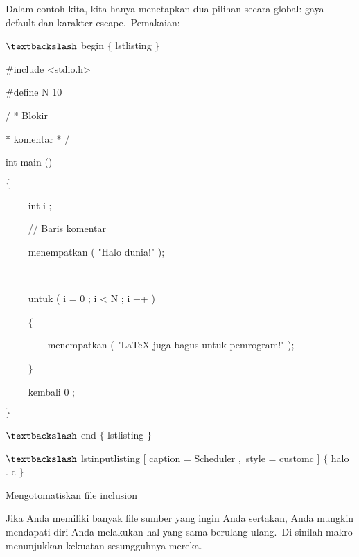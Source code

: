 Dalam contoh kita, kita hanya menetapkan dua pilihan secara global: gaya default dan karakter escape. Pemakaian:\par

 $\textbackslash$ begin $ \{ $ lstlisting $ \} $\par

 $\#$include <stdio.h>\par

 $\#$define N 10\par

 / * Blokir\par

 * komentar * /\par

 int main ()\par

 $ \{ $\par

~~~~ int i ;\par

~~~~ // Baris komentar\par

~~~~ menempatkan ( "Halo dunia!" );\par

~~~ \par

~~~~ untuk ( i = 0 ; i < N ; i ++ )\par

~~~~ $ \{ $\par

~~~~~~~~ menempatkan ( "LaTeX juga bagus untuk pemrogram!" );\par

~~~~ $ \} $\par

~~~~ kembali 0 ;\par

 $ \} $\par

 $\textbackslash$ end $ \{ $ lstlisting $ \} $\par

 $\textbackslash$ lstinputlisting [ caption = Scheduler ,~style = customc ] $ \{ $ halo .  c $ \} $\par

Mengotomatiskan file inclusion \par

Jika Anda memiliki banyak file sumber yang ingin Anda sertakan, Anda mungkin mendapati diri Anda melakukan hal yang sama berulang-ulang. Di sinilah makro menunjukkan kekuatan sesungguhnya mereka.\par

